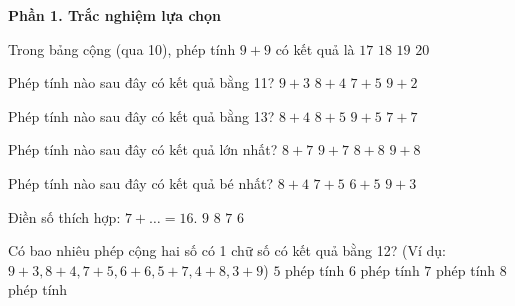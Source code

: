 \textbf{Phần 1. Trắc nghiệm lựa chọn}

\begin{ex} %
Trong bảng cộng (qua 10), phép tính $9 + 9$ có kết quả là
\choice
{$17$}
{\True $18$}
{$19$}
{$20$}
\end{ex}

\begin{ex} %
Phép tính nào sau đây có kết quả bằng 11?
\choice
{$9 + 3$}
{$8 + 4$}
{$7 + 5$}
{\True $9 + 2$}
\end{ex}

\begin{ex} %
Phép tính nào sau đây có kết quả bằng 13?
\choice
{$8 + 4$}
{\True $8 + 5$}
{$9 + 5$}
{$7 + 7$}
\end{ex}

\begin{ex} %
Phép tính nào sau đây có kết quả lớn nhất?
\choice
{$8 + 7$}
{$9 + 7$}
{$8 + 8$}
{\True $9 + 8$}
\end{ex}

\begin{ex} %
Phép tính nào sau đây có kết quả bé nhất?
\choice
{$8 + 4$}
{$7 + 5$}
{\True $6 + 5$}
{$9 + 3$}
\end{ex}

\begin{ex} %
Điền số thích hợp: $7 + \dots = 16$.
\choice
{\True $9$}
{$8$}
{$7$}
{$6$}
\end{ex}

\begin{ex} %
Có bao nhiêu phép cộng hai số có 1 chữ số có kết quả bằng 12? (Ví dụ: $9+3, 8+4, 7+5, 6+6, 5+7, 4+8, 3+9$)
\choice
{$5$ phép tính}
{$6$ phép tính}
{\True $7$ phép tính}
{$8$ phép tính}
\end{ex}

